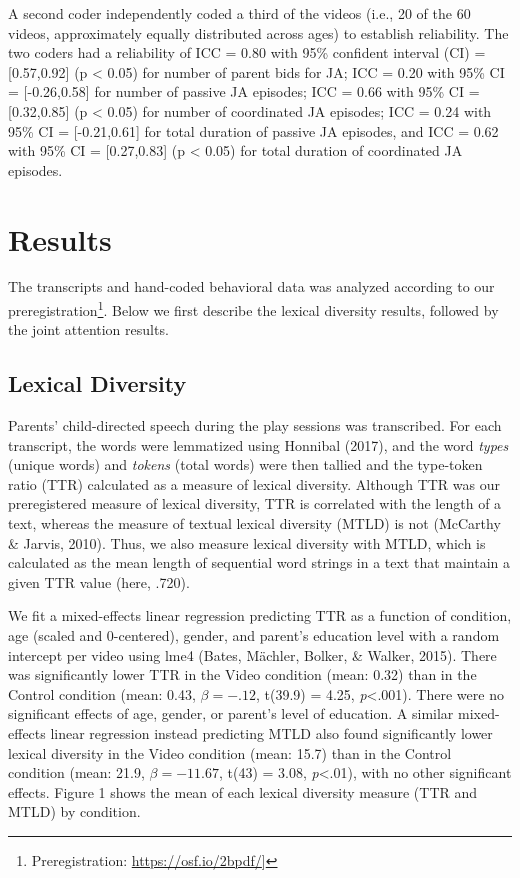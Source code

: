 \documentclass[10pt, letterpaper]{article}
\begin{document}
A second coder independently coded a third of the videos (i.e., 20 of
the 60 videos, approximately equally distributed across ages) to
establish reliability. The two coders had a reliability of ICC = 0.80
with 95\% confident interval (CI) = {[}0.57,0.92{]} (p \textless{} 0.05)
for number of parent bids for JA; ICC = 0.20 with 95\% CI =
{[}-0.26,0.58{]} for number of passive JA episodes; ICC = 0.66 with 95\%
CI = {[}0.32,0.85{]} (p \textless{} 0.05) for number of coordinated JA
episodes; ICC = 0.24 with 95\% CI = {[}-0.21,0.61{]} for total duration
of passive JA episodes, and ICC = 0.62 with 95\% CI = {[}0.27,0.83{]} (p
\textless{} 0.05) for total duration of coordinated JA episodes.

\section{Results}\label{results}

The transcripts and hand-coded behavioral data was analyzed according to
our preregistration\footnote{Preregistration:
  \url{https://osf.io/2bpdf/}{]}}. Below we first describe the lexical
diversity results, followed by the joint attention results.

\subsection{Lexical Diversity}\label{lexical-diversity}

Parents' child-directed speech during the play sessions was transcribed.
For each transcript, the words were lemmatized using Honnibal (2017),
and the word \emph{types} (unique words) and \emph{tokens} (total words)
were then tallied and the type-token ratio (TTR) calculated as a measure
of lexical diversity. Although TTR was our preregistered measure of
lexical diversity, TTR is correlated with the length of a text, whereas
the measure of textual lexical diversity (MTLD) is not (McCarthy \&
Jarvis, 2010). Thus, we also measure lexical diversity with MTLD, which
is calculated as the mean length of sequential word strings in a text
that maintain a given TTR value (here, .720).

We fit a mixed-effects linear regression predicting TTR as a function of
condition, age (scaled and 0-centered), gender, and parent's education
level with a random intercept per video using lme4 (Bates, Mächler,
Bolker, \& Walker, 2015). There was significantly lower TTR in the Video
condition (mean: 0.32) than in the Control condition (mean: 0.43,
\(\beta=-.12\), t(39.9) = 4.25, \emph{p}\textless{}.001). There were no
significant effects of age, gender, or parent's level of education. A
similar mixed-effects linear regression instead predicting MTLD also
found significantly lower lexical diversity in the Video condition
(mean: 15.7) than in the Control condition (mean: 21.9,
\(\beta=-11.67\), t(43) = 3.08, \emph{p}\textless{}.01), with no other
significant effects. Figure 1 shows the mean of each lexical diversity
measure (TTR and MTLD) by condition.
\end{document}
